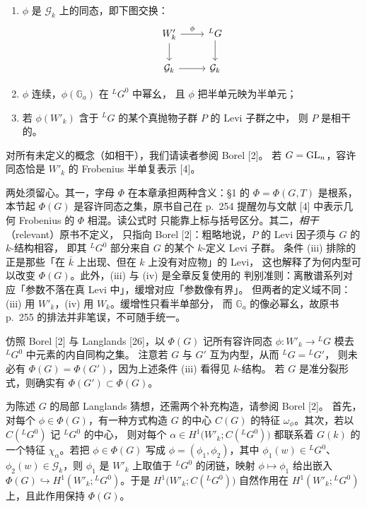 \begin{enumerate}[label=(\roman*),leftmargin=*]
  \item $\phi$ 是 $\mathcal{G}_k$ 上的同态，即下图交换：
\[
\begin{tikzcd}
  W'_k \arrow[r,"\phi"] \arrow[d] & {}^{L}G \arrow[d] \\
  \mathcal{G}_k \arrow[r] & \mathcal{G}_k
\end{tikzcd}
\]
  \item $\phi$ 连续，$\phi(\mathbb{G}_a)$ 在 ${}^{L}G^{0}$ 中幂幺，
    且 $\phi$ 把半单元映为半单元；
  \item 若 $\phi(W'_k)$ 含于 ${}^{L}G$ 的某个真抛物子群 $P$ 的 Levi 子群之中，
    则 $P$ 是相干的。
\end{enumerate}

对所有未定义的概念（如相干），我们请读者参阅 Borel [2]。
若 $G=\mathrm{GL}_n$，容许同态恰是 $W'_k$ 的 Frobenius 半单复表示 [4]。
\begin{annote}
两处须留心。其一，字母 $\Phi$ 在本章承担两种含义：\S1 的
$\Phi=\Phi(G,T)$ 是根系，本节起 $\Phi(G)$ 是容许同态之集，原书自己在
p.~254 提醒勿与文献 [4] 中表示几何 Frobenius 的 $\Phi$ 相混。读公式时
只能靠上标与括号区分。其二，\emph{相干}（relevant）原书不定义，
只指向 Borel [2]：粗略地说，$P$ 的 Levi 因子须与 $G$ 的 $k$-结构相容，
即其 ${}^{L}G^{0}$ 部分来自 $G$ 的某个 $k$-定义 Levi 子群。
条件 (iii) 排除的正是那些「在 $\bar k$ 上出现、但在 $k$ 上没有对应物」的 Levi，
这也解释了为何内型可以改变 $\Phi(G)$。此外，(iii) 与 (iv) 是全章反复使用的
判别准则：离散谱系列对应「参数不落在真 Levi 中」，缓增对应「参数像有界」。
但两者的定义域不同：(iii) 用 $W'_k$，(iv) 用 $W_k$。缓增性只看半单部分，
而 $\mathbb{G}_a$ 的像必幂幺，故原书 p.~255 的排法并非笔误，不可随手统一。
\par{}
\end{annote}

仿照 Borel [2] 与 Langlands [26]，以 $\Phi(G)$ 记所有容许同态
$\phi\colon W'_k\to{}^{L}G$ 模去 ${}^{L}G^{0}$ 中元素的内自同构之集。
注意若 $G$ 与 $G'$ 互为内型，从而 ${}^{L}G={}^{L}G'$，
则未必有 $\Phi(G)=\Phi(G')$，因为上述条件 (iii) 看得见 $k$-结构。
若 $G$ 是准分裂形式，则确实有 $\Phi(G')\subset\Phi(G)$。

为陈述 $G$ 的局部 Langlands 猜想，还需两个补充构造，请参阅 Borel [2]。
首先，对每个 $\phi\in\Phi(G)$，有一种方式构造 $G$ 的中心 $C(G)$ 的特征
$\omega_\phi$。其次，若以 $C({}^{L}G^{0})$ 记 ${}^{L}G^{0}$ 的中心，
则对每个 $\alpha\in H^{1}\bigl(W'_k;C({}^{L}G^{0})\bigr)$ 都联系着 $G(k)$
的一个特征 $\chi_\alpha$。若把 $\phi\in\Phi(G)$ 写成
$\phi=(\phi_1,\phi_2)$，其中 $\phi_1(w)\in{}^{L}G^{0}$、
$\phi_2(w)\in\mathcal{G}_k$，则 $\phi_1$ 是 $W'_k$ 上取值于 ${}^{L}G^{0}$
的闭链，映射 $\phi\mapsto\phi_1$ 给出嵌入
$\Phi(G)\hookrightarrow H^{1}(W'_k;{}^{L}G^{0})$。于是
$H^{1}\bigl(W'_k;C({}^{L}G^{0})\bigr)$ 自然作用在
$H^{1}(W'_k;{}^{L}G^{0})$ 上，且此作用保持 $\Phi(G)$。

